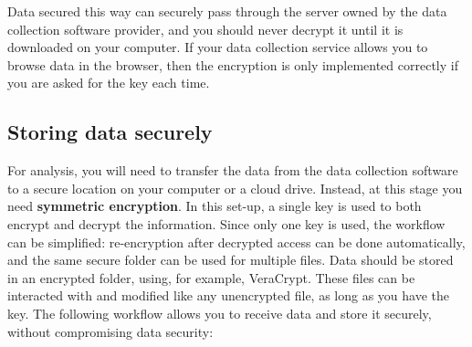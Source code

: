 Data secured this way can securely pass through the server owned by the data collection software provider,
and you should never decrypt it until it is downloaded on your computer.
If your data collection service allows you to browse data in the browser, 
then the encryption is only implemented correctly if you are asked for the key each time.



\subsection{Storing data securely}
For analysis, you will need to transfer the data from the data collection software to
a secure location on your computer or a cloud drive.
Instead, at this stage you need \textbf{symmetric encryption}.
In this set-up, a single key is used to both encrypt and decrypt the information.
Since only one key is used, the workflow can be simplified:
re-encryption after decrypted access can be done automatically,
and the same secure folder can be used for multiple files.
Data should be stored in an encrypted folder,
using, for example, VeraCrypt.
These files can be interacted with and modified like any unencrypted file,
 as long as you have the key.
The following workflow allows you to receive data and store it securely,
without compromising data security:

